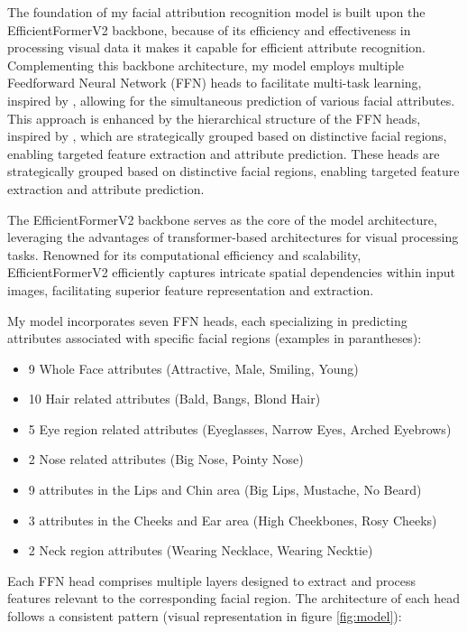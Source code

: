 \documentclass[a4paper,oneside]{article}
\begin{document}
The foundation of my facial attribution recognition model is built upon the EfficientFormerV2 backbone, because of its efficiency and effectiveness in processing visual data it makes it capable for efficient attribute recognition.
Complementing this backbone architecture, my model employs multiple Feedforward Neural Network (FFN) heads to facilitate multi-task learning, inspired by \citet{DBLP:journals/corr/HandC16}, allowing for the simultaneous prediction of various facial attributes.
This approach is enhanced by the hierarchical structure of the FFN heads, inspired by \citet{DBLP:journals/corr/HanJSC17}, which are strategically grouped based on distinctive facial regions, enabling targeted feature extraction and attribute prediction.
These heads are strategically grouped based on distinctive facial regions, enabling targeted feature extraction and attribute prediction.

The EfficientFormerV2 backbone serves as the core of the model architecture, leveraging the advantages of transformer-based architectures for visual processing tasks.
Renowned for its computational efficiency and scalability, EfficientFormerV2 efficiently captures intricate spatial dependencies within input images, facilitating superior feature representation and extraction.

My model incorporates seven FFN heads, each specializing in predicting attributes associated with specific facial regions (examples in parantheses):

\begin{itemize}
  \itemsep0em 
  \item 9 Whole Face attributes (Attractive, Male, Smiling, Young)
  \item 10 Hair related attributes (Bald, Bangs, Blond Hair)
  \item 5 Eye region related attributes (Eyeglasses, Narrow Eyes, Arched Eyebrows)
  \item 2 Nose related attributes (Big Nose, Pointy Nose)
  \item 9 attributes in the Lips and Chin area (Big Lips, Mustache, No Beard)
  \item 3 attributes in the Cheeks and Ear area (High Cheekbones, Rosy Cheeks)
  \item 2 Neck region attributes (Wearing Necklace, Wearing Necktie)
\end{itemize}

Each FFN head comprises multiple layers designed to extract and process features relevant to the corresponding facial region.
The architecture of each head follows a consistent pattern (visual representation in figure \ref{fig:model}):
\end{document}
